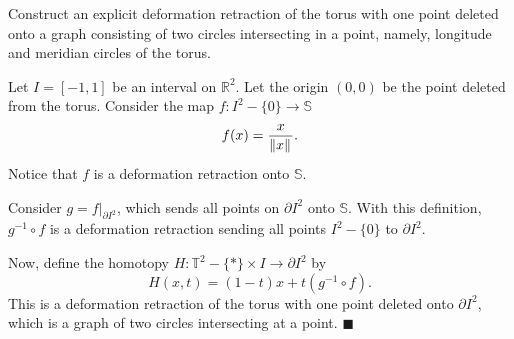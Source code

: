 \question Construct an explicit deformation retraction of the torus with one 
point deleted onto a graph consisting of two circles intersecting in a point, 
namely, longitude and meridian circles of the torus.

\begin{solution}
Let $I = [-1, 1]$ be an interval on $\mathbb{R}^2$. Let the origin $(0,0)$ be
the point deleted from the torus. Consider the map $f: I^2 - \{0\} \rightarrow
\mathbb{S}$ \[f(x) = \frac{x}{\left\|{x}\right\|_{{}_{}}}.\] Notice that $f$ is a deformation 
retraction onto $\mathbb{S}$.

Consider $g = f\rvert_{\partial I^2}$, which sends all points on $\partial I^2$
onto $\mathbb{S}$. With this definition, $g^{-1} \circ f$ is a deformation
retraction sending all points $I^2 - \{0\}$ to $\partial I^2$.

Now, define the homotopy $H: \mathbb{T}^2 - \{*\} \times I \rightarrow \partial
I^2$ by \[ H(x,t) = (1-t)x + t(g^{-1} \circ f). \] This is a deformation
retraction of the torus with one point deleted onto $\partial I^2$, which is a
graph of two circles intersecting at a point. \hfill $\blacksquare$

\end{solution}